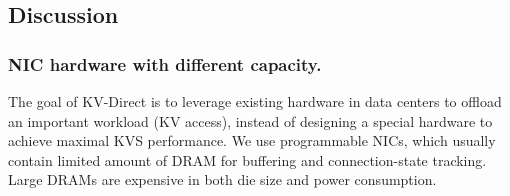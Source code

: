\subsection{Discussion}
\label{kvdirect:sec:discussion}

\subsubsection{NIC hardware with different capacity.}
\label{kvdirect:sec:different-nic}

The goal of KV-Direct is to leverage existing hardware in data centers to offload an important workload (KV access), instead of designing a special hardware to achieve maximal KVS performance. We use programmable NICs, which usually contain limited amount of DRAM for buffering and connection-state tracking. Large DRAMs are expensive in both die size and power consumption.

\begin{table}[t]
\centering
{}
\caption{Optimal load dispatch ratio for long-tail workload under different NIC DRAM/PCIe throughput ratio (vertical) and NIC/host memory size ratio (horizontal).}
\label{kvdirect:tab:optimal-load-dispatch}

\end{table}

